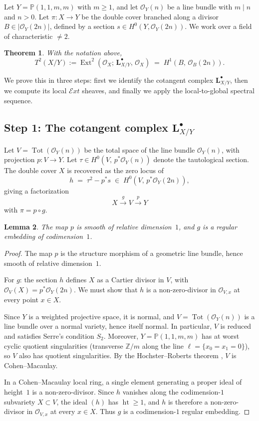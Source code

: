 \documentclass[11pt,twoside]{amsart}
\theoremstyle{plain}
\numberwithin{equation}{section}
\newtheorem{theorem}{Theorem}[section]
\newtheorem{lemma}[theorem]{Lemma}
\newcommand{\OO}{\mathcal{O}}
\newcommand{\PP}{\mathbb{P}}
\newcommand{\ZZ}{\mathbb{Z}}
\theoremstyle{definition}
\newcommand{\Ext}{\operatorname{Ext}}
\DeclareMathOperator{\Tot}{Tot}
\DeclareMathOperator{\height}{ht}
\newcommand{\LL}{\mathbf{L}}
\begin{document}
Let $Y = \PP(1,1,m,m)$ with $m \geq 1$, and let $\OO_Y(n)$ be a line bundle with $m \mid n$ and $n > 0$. Let $\pi\colon X \to Y$ be the double cover branched along a divisor $B \in |\OO_Y(2n)|$, defined by a section $s \in H^0(Y, \OO_Y(2n))$. We work over a field of characteristic $\neq 2$.
 
\begin{theorem}\label{thm:T2}
With the notation above,
\[
T^2(X/Y) := \Ext^2(\OO_X;\, \LL^\bullet_{X/Y},\, \OO_X) \;=\; H^1(B,\, \OO_B(2n)).
\]
\end{theorem}
 
We prove this in three steps: first we identify the cotangent complex $\LL^\bullet_{X/Y}$, then we compute its local $\mathcal{E}xt$ sheaves, and finally we apply the local-to-global spectral sequence.
 
\bigskip
 
\subsection{Step 1: The cotangent complex $\LL^\bullet_{X/Y}$}
 
Let $V = \Tot(\OO_Y(n))$ be the total space of the line bundle $\OO_Y(n)$, with projection $p\colon V \to Y$. Let $\tau \in H^0(V,\, p^*\OO_Y(n))$ denote the tautological section. The double cover $X$ is recovered as the zero locus of
\[
h \;=\; \tau^2 - p^*s \;\in\; H^0(V,\, p^*\OO_Y(2n)),
\]
giving a factorization
\[
X \xrightarrow{\;g\;} V \xrightarrow{\;p\;} Y
\]
with $\pi = p \circ g$.
 
\begin{lemma}\label{lem:factorization}
The map $p$ is smooth of relative dimension~$1$, and $g$ is a regular embedding of codimension~$1$.
\end{lemma}
 
\begin{proof}
The map $p$ is the structure morphism of a geometric line bundle, hence smooth of relative dimension~$1$.
 
For $g$: the section $h$ defines $X$ as a Cartier divisor in $V$, with $\OO_V(X) = p^*\OO_Y(2n)$. We must show that $h$ is a non-zero-divisor in $\OO_{V,x}$ at every point $x \in X$.
 
Since $Y$ is a weighted projective space, it is normal, and $V = \Tot(\OO_Y(n))$ is a line bundle over a normal variety, hence itself normal. In particular, $V$ is reduced and satisfies Serre's condition $S_2$. Moreover, $Y = \PP(1,1,m,m)$ has at worst cyclic quotient singularities (transverse $\ZZ/m$ along the line $\ell = \{x_0 = x_1 = 0\}$), so $V$ also has quotient singularities. By the Hochster--Roberts theorem \cite{HR}, $V$ is Cohen--Macaulay.
 
In a Cohen--Macaulay local ring, a single element generating a proper ideal of height~$1$ is a non-zero-divisor. Since $h$ vanishes along the codimension-$1$ subvariety $X \subset V$, the ideal $(h)$ has $\height \geq 1$, and $h$ is therefore a non-zero-divisor in $\OO_{V,x}$ at every $x \in X$. Thus $g$ is a codimension-$1$ regular embedding.
\end{proof}
 
\end{document}
